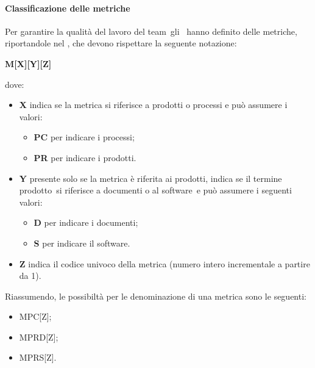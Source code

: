 \documentclass[../NormeProgetto.text]{subfiles}
\begin{document}
		\paragraph{Classificazione delle metriche}
					Per garantire la qualità del lavoro del team\g{}li \amministratori\ hanno definito delle metriche, riportandole nel \pianodiqualifica , che devono rispettare la seguente notazione: \begin{center}\textbf{M[X][Y][Z]}\end{center} dove:
			\begin{itemize}
				\item \textbf{X} indica se la metrica si riferisce a prodotti o processi e può assumere i valori:
				\begin{itemize}
					\item \textbf{PC} per indicare i processi;
					\item \textbf{PR} per indicare i prodotti.
				\end{itemize}
				\item \textbf{Y} presente solo se la metrica è riferita ai prodotti, indica se il termine prodotto\g\ si riferisce a documenti o al software\g\ e può assumere i seguenti valori:
					\begin{itemize}
						\item \textbf{D} per indicare i documenti;
						\item \textbf{S} per indicare il software\g.
					\end{itemize}
				\item \textbf{Z} indica il codice univoco della metrica (numero intero incrementale a partire da 1).
			\end{itemize}
			Riassumendo, le possibiltà per le denominazione di una metrica sono le seguenti:
			\begin{itemize}
				\item MPC[Z];
				\item MPRD[Z];
				\item MPRS[Z].
			\end{itemize}
\end{document}
